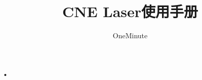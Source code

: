 \documentclass[10pt,a4paper,final]{book}
\author{OneMinute}
\title{CNE Laser使用手册}
\begin{document}
•
\end{document}
